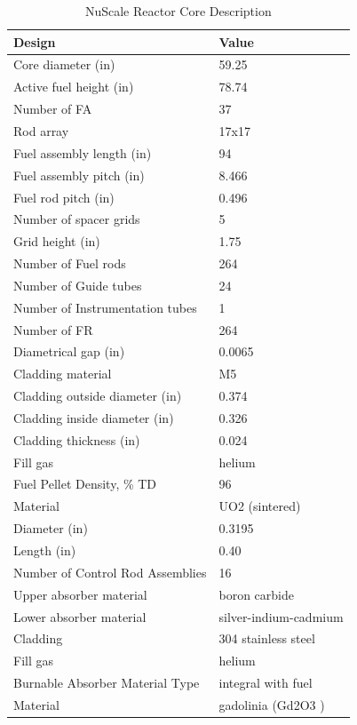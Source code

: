 \begin{table} [htbp]
\begin{center}

\caption{NuScale Reactor Core Description \cite{nuscale_chapter_2018}}
\label{Nutable}
\begin{tabular}{l     l}
\hline 
Design 		&Value \\ 
\hline 
Core diameter (in)			&59.25\\
Active fuel height (in)	&78.74\\

Number of FA 		&  37\\
Rod array   			&17x17\\
Fuel assembly length (in) &  94\\
Fuel assembly pitch (in)	&8.466\\
Fuel rod pitch (in)&0.496\\
Number of spacer grids&5\\
Grid height (in)&1.75\\
Number of Fuel rods&264\\
Number of Guide tubes&24\\
Number of Instrumentation tubes&1\\
\hline 
Number of FR&264\\
Diametrical gap (in)&0.0065\\
Cladding material&M5\\
Cladding outside diameter (in)&0.374\\
Cladding inside diameter (in)&0.326\\
Cladding thickness (in)&0.024\\
Fill gas&helium\\
\hline 
Fuel Pellet Density, \% TD&96\\
Material&UO2 (sintered)\\
Diameter (in)&0.3195\\
Length (in) &0.40\\
\hline 
Number of Control Rod Assemblies&16                              \\
Upper absorber material&boron carbide              \\
Lower absorber material&silver-indium-cadmium \\
Cladding&304 stainless steel      \\
Fill gas&helium                        \\
\hline 
Burnable Absorber Material Type&integral with fuel         \\
Material &gadolinia (Gd2O3 )      \\

\end{tabular}
\end{center}
\end{table}
